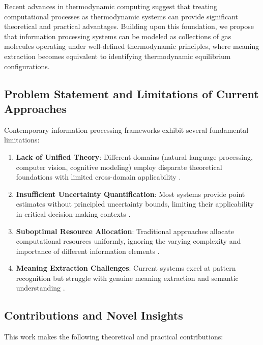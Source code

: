 \documentclass[11pt,a4paper]{article}
\begin{document}
Recent advances in thermodynamic computing \citep{landauer1961irreversibility, bennett1982thermodynamics} suggest that treating computational processes as thermodynamic systems can provide significant theoretical and practical advantages. Building upon this foundation, we propose that information processing systems can be modeled as collections of gas molecules operating under well-defined thermodynamic principles, where meaning extraction becomes equivalent to identifying thermodynamic equilibrium configurations.

\subsection{Problem Statement and Limitations of Current Approaches}

Contemporary information processing frameworks exhibit several fundamental limitations:

\begin{enumerate}
\item \textbf{Lack of Unified Theory}: Different domains (natural language processing, computer vision, cognitive modeling) employ disparate theoretical foundations with limited cross-domain applicability \citep{lecun2015deep, goodfellow2016deep}.

\item \textbf{Insufficient Uncertainty Quantification}: Most systems provide point estimates without principled uncertainty bounds, limiting their applicability in critical decision-making contexts \citep{gal2016dropout, kendall2017uncertainties}.

\item \textbf{Suboptimal Resource Allocation}: Traditional approaches allocate computational resources uniformly, ignoring the varying complexity and importance of different information elements \citep{graves2016adaptive, bengio2013representation}.

\item \textbf{Meaning Extraction Challenges}: Current systems excel at pattern recognition but struggle with genuine meaning extraction and semantic understanding \citep{bender2020climbing, marcus2020next}.
\end{enumerate}

\subsection{Contributions and Novel Insights}

This work makes the following theoretical and practical contributions:
\end{document}
